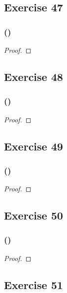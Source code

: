 \documentclass[14pt]{extarticle}
\begin{document}
\subsection{Exercise 47}

\subsubsection{()}

\begin{proof}

\end{proof}

\subsection{Exercise 48}

\subsubsection{()}

\begin{proof}

\end{proof}

\subsection{Exercise 49}

\subsubsection{()}

\begin{proof}

\end{proof}

\subsection{Exercise 50}

\subsubsection{()}

\begin{proof}

\end{proof}

\subsection{Exercise 51}
\end{document}
